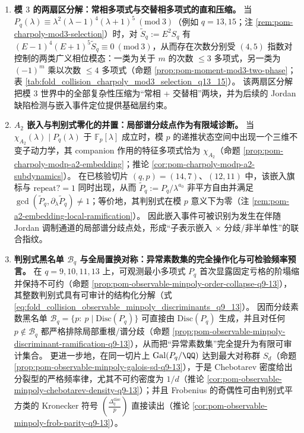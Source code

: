 \begin{enumerate}
  \item \textbf{模 \texorpdfstring{$3$}{3} 的两扇区分解：常相多项式与交替相多项式的直和压缩。}
  当 \(P_q(\lambda)\equiv \lambda^2(\lambda-1)^4(\lambda+1)^5\ (\mathrm{mod}\ 3)\)（例如 \(q=13,15\)；注 \ref{rem:pom-charpoly-mod3-selection}）时，对 \(\widetilde S_q:=E^2S_q\) 有
  \((E-1)^4(E+1)^5\widetilde S_q\equiv 0\ (\mathrm{mod}\ 3)\)，从而存在次数分别受 \((4,5)\) 指数对控制的两类广义相位模态：一类为关于 \(m\) 的次数 \(\le 3\) 多项式，另一类为 \((-1)^m\) 乘以次数 \(\le 4\) 多项式（命题 \ref{prop:pom-moment-mod3-two-phase}；表 \ref{tab:fold_collision_charpoly_mod3_selection_q13_15}）。
  该两扇区分解把模 \(3\) 世界中的全部复杂性压缩为“常相 + 交替相”两块，并为后续的 Jordan 缺陷检测与嵌入事件定位提供基础层约束。

  \item \textbf{\texorpdfstring{$A_2$}{A2} 嵌入与判别式零化的并置：局部谱分歧点作为有限域诊断。}
  当 \(\chi_{A_2}(\lambda)\mid P_q(\lambda)\) 于 \(\mathbb{F}_p[\lambda]\) 成立时，模 \(p\) 的递推状态空间中出现一个三维不变子动力学，其 companion 作用的特征多项式恰为 \(\chi_{A_2}\)（命题 \ref{prop:pom-charpoly-modp-a2-embedding}；推论 \ref{cor:pom-charpoly-modp-a2-subdynamics}）。
  在已核验切片 \((q,p)=(14,7)\)、\((12,11)\) 中，该嵌入旗标与 \(\mathrm{repeat?}=1\) 同时出现，从而 \(\widetilde P_q:=P_q/\lambda^{a_0}\) 非平方自由并满足 \(\gcd(\widetilde P_q,\partial_\lambda\widetilde P_q)\neq 1\)；等价地，其判别式在模 \(p\) 意义下为零（注 \ref{rem:pom-a2-embedding-local-ramification}）。
  因此嵌入事件可被识别为发生在伴随 Jordan 调制通道的局部谱分歧点处，形成“子表示嵌入 \(\times\) 分歧/非半单性”的联合指纹。

  \item \textbf{判别式黑名单 \texorpdfstring{$\mathcal{B}_q$}{Bq} 与全局置换对称：异常素数集的完全操作化与可检验频率预言。}
  在 \(q=9,10,11,13\) 上，可观测最小多项式 \(P_q\) 首次显露固定亏格的阶塌缩并保持不可约（命题 \ref{prop:pom-observable-minpoly-order-collapse-q9-13}），其整数判别式具有可审计的结构化分解（式 \eqref{eq:fold_collision_observable_minpoly_discriminants_q9_13}）。
  因而分歧素数黑名单
  \(\mathcal{B}_q=\{p:\ p\mid \mathrm{Disc}(P_q)\}\)
  可直接由 \(\mathrm{Disc}(P_q)\) 生成，并且对任何 \(p\notin\mathcal{B}_q\) 都严格排除局部重根/谱分歧（命题 \ref{prop:pom-observable-minpoly-discriminant-ramification-q9-13}），从而把“异常素数集”完全提升为有限可审计集合。
  更进一步地，在同一切片上 \(\mathrm{Gal}(P_q/\QQ)\) 达到最大对称群 \(S_d\)（命题 \ref{prop:pom-observable-minpoly-galois-sd-q9-13}），于是 Chebotarev 密度给出分裂型的严格频率律，尤其不可约密度为 \(1/d\)（推论 \ref{cor:pom-observable-minpoly-chebotarev-density-q9-13}）；并且 Frobenius 的奇偶性可由判别式平方类的 Kronecker 符号 \(\left(\frac{\Delta_q^{\mathrm{disc}}}{p}\right)\) 直接读出（推论 \ref{cor:pom-observable-minpoly-frob-parity-q9-13}）。


\end{enumerate}
